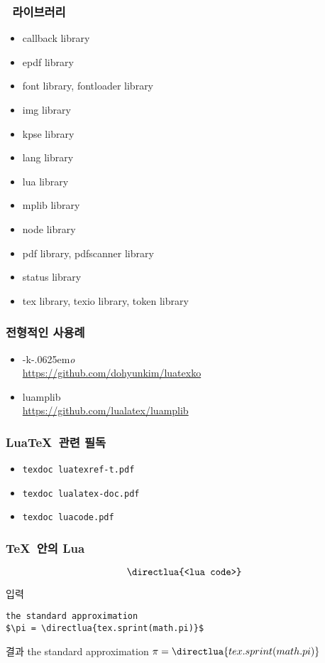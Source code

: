 \documentclass{beamer}
\def\luatex{\hologo{LuaTeX}}
\def\logoko{\textsf{k}\kern-.0625em\textit{o}}
\def\luatexko{\luatex-\logoko}
\begin{document}
%
\begin{frame}
  \frametitle{\luatex\ 라이브러리}
  \vspace{-3mm}
  \begin{itemize}
  \item callback library
  \item epdf library
  \item font library, fontloader library
  \item img library
  \item kpse library
  \item lang library
  \item lua library
  \item mplib library
  \item node library
  \item pdf library, pdfscanner library
  \item status library
  \item tex library, texio library, token library
  \end{itemize}
\end{frame}

%
\begin{frame}
  \frametitle{ 전형적인 사용례}
  \begin{itemize}
  \item \luatexko\\ \url{https://github.com/dohyunkim/luatexko}
  \item luamplib\\ \url{https://github.com/lualatex/luamplib}
  \end{itemize}
\end{frame}

%
\begin{frame}[fragile]
  \frametitle{Lua\TeX\ 관련 필독}
  \begin{itemize}
    \setlength\itemsep{1em}
  \item \texttt{texdoc luatexref-t.pdf}
  \item \texttt{texdoc lualatex-doc.pdf}
  \item \texttt{texdoc luacode.pdf}
  \end{itemize}
\end{frame}

%
\begin{frame}[fragile]
  \frametitle{\TeX\ 안의 Lua}
  \[\texttt{\string\directlua\{<lua code>\}}\]
  \begin{block}{입력}
\begin{verbatim}
the standard approximation 
$\pi = \directlua{tex.sprint(math.pi)}$
\end{verbatim}
  \end{block}
  \begin{block}{결과}
    the standard approximation $\pi = \directlua{tex.sprint(math.pi)}$
  \end{block}
\end{frame}
\end{document}
